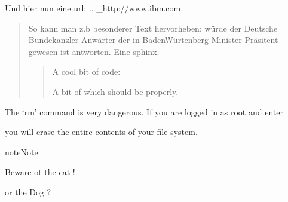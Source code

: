 \documentclass[letterpaper,10pt,english]{sphinxmanual}
\begin{document}
\begin{sphinxVerbatim}[commandchars=\\\{\},numbers=left,firstnumber=1,stepnumber=1]
   

  
    
    
\end{sphinxVerbatim}

\sphinxAtStartPar
Und hier nun eine url:
.. \_http://www.ibm.com
\begin{quote}

\sphinxAtStartPar
So kann man z.b besonderer Text hervorheben:  würde der Deutsche Bundekanzler Anwärter
der in Baden\sphinxhyphen{}Würtenberg Minister Präsitent gewesen ist antworten. Eine  sphinx.
\begin{quote}

\sphinxAtStartPar
A cool bit of code:

\begin{sphinxVerbatim}[commandchars=\\\{\}]
   
\end{sphinxVerbatim}

\begin{sphinxVerbatim}[commandchars=\\\{\}]
A bit of  which should be  properly.
\end{sphinxVerbatim}
\end{quote}
\end{quote}

\sphinxAtStartPar
The ‘rm’ command is very dangerous.  If you are logged
in as root and enter

\begin{sphinxVerbatim}[commandchars=\\\{\}]
 
  
\end{sphinxVerbatim}
\noindent
you will erase the entire contents of your file system.

\begin{sphinxadmonition}{note}{Note:}
\begin{DUlineblock}{0em}
\item[] Beware ot the cat !
\item[] or the Dog ?
\end{DUlineblock}
\end{sphinxadmonition}
\end{document}
